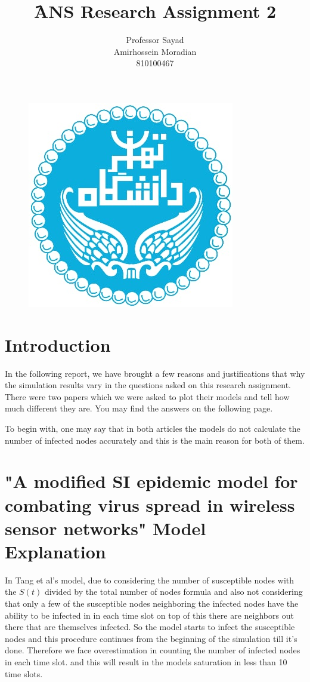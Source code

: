 \documentclass[a4paper]{article}
\title{َ\textbf{ANS Research Assignment 2}}
\author{ Professor Sayad\\ Amirhossein Moradian\\  810100467}
\begin{document}
	
	\begin{figure}
		\centering
		\includegraphics[scale=0.75]{Figures/UT1}
	\end{figure}
	
	\maketitle
	
	\section*{Introduction}	
	In the following report, we have brought a few reasons and justifications that why the simulation results vary in the questions asked on this research assignment.\\
	There were two papers which we were asked to plot their models and tell how much different they are. You may find the answers on the following page.
	\pagebreak
	
	
	To begin with, one may say that in both articles the models do not calculate the number of infected nodes accurately and this is the main reason for both of them.
	
	\section{"A modified SI epidemic model for combating virus spread in wireless sensor networks" Model Explanation}
	
	In Tang et al's model, due to considering the number of susceptible nodes with the $S(t)$ divided by the total number of nodes formula and also not considering that only a few of the susceptible nodes neighboring the infected nodes have the ability to be infected in in each time slot on top of this there are neighbors out there that are themselves infected. So the model starts to infect the susceptible nodes and this procedure continues from the beginning of the simulation till it's done. Therefore we face overestimation in counting the number of infected nodes in each time slot. and this will result in the models saturation in less than 10 time slots.
	
\end{document}

